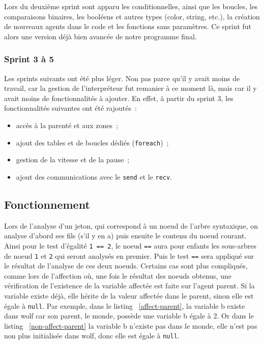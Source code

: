 Lors du deuxième sprint sont apparu les conditionnelles, ainsi que les boucles, les comparaisons binaires, les booléens et autres types (color, string, etc.), la création de nouveaux agents dans le code et les fonctions sans paramètres. Ce sprint fut alors une version déjà bien avancée de notre programme final.


\subsubsection{Sprint 3 à 5}
Les sprints suivants ont été plus léger. Non pas parce qu'il y avait moins de travail, car la gestion de l'interpréteur fut remanier à ce moment là, mais car il y avait moins de fonctionnalités à ajouter. En effet, à partir du sprint 3, les fonctionnalités suivantes ont été rajoutés~:
\begin{itemize}
\item accès à la parenté et aux zones~;
\item ajout des tables et de boucles dédiés (\verb|foreach|)~;
\item gestion de la vitesse et de la pause~;
\item ajout des communications avec le \verb|send| et le \verb|recv|.
\end{itemize}


\subsection{Fonctionnement}
Lors de l'analyse d'un jeton, qui correspond à un noeud de l'arbre syntaxique, on analyse d'abord ses fils (s'il y en a) puis ensuite le contenu du noeud courant.
Ainsi pour le test d'égalité \verb|1 == 2|, le noeud \verb|==| aura pour enfants les sous-arbres de noeud \verb|1| et \verb|2| qui seront analysés en premier. Puis le test \verb|==| sera appliqué sur le résultat de l'analyse de ces deux noeuds.
Certains cas sont plus compliqués, comme lors de l'affection où, une fois le résultat des noeuds obtenus, une vérification de l'existence de la variable affectée est faite sur l'agent parent. Si la variable existe déjà, elle hérite de la valeur affectée dans le parent, sinon elle est égale à \verb|null|.
Par exemple, dans le listing ~\ref{affect-parent}, la variable b existe dans wolf car son parent, le monde, possède une variable b égale à 2. Or dans le listing ~\ref{non-affect-parent} la variable b n'existe pas dans le monde, elle n'est pas non plus initialisée dans wolf, donc elle est égale à \verb|null|.

